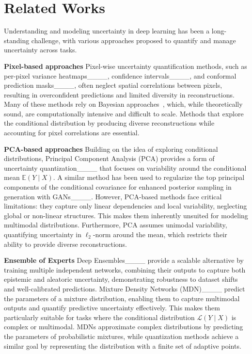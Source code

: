 \section{Related Works}
Understanding and modeling uncertainty in deep learning has been a long-standing challenge, with various approaches proposed to quantify and manage uncertainty across tasks.

\textbf{Pixel-based approaches}
Pixel-wise uncertainty quantification methods, such as per-pixel variance heatmaps____, confidence intervals____, and conformal prediction masks____, often neglect spatial correlations between pixels, resulting in overconfident predictions and limited diversity in reconstructions. Many of these methods rely on Bayesian approaches~\cite {gal2016dropout, blundell2015weight}, which, while theoretically sound, are computationally intensive and difficult to scale. Methods that explore the conditional distribution by producing diverse reconstructions while accounting for pixel correlations are essential.

\textbf{PCA-based approaches}
Building on the idea of exploring conditional distributions, Principal Component Analysis (PCA) provides a form of uncertainty quantization____ that focuses on variability around the conditional mean \( \mathbb{E}(Y \mid X) \). A similar method has been used to regularize the top principal components of the conditional covariance for enhanced posterior sampling in generation with GANs____.
However, PCA-based methods face critical limitations: they capture only linear dependencies and local variability, neglecting global or non-linear structures.
This makes them inherently unsuited for modeling multimodal distributions. Furthermore, PCA assumes unimodal variability, quantifying uncertainty in \( \ell_2 \)-norm around the mean, which restricts their ability to provide diverse reconstructions.
%

\textbf{Ensemble of Experts}
Deep Ensembles____ provide a scalable alternative by training multiple independent networks, combining their outputs to capture both epistemic and aleatoric uncertainty, demonstrating robustness to dataset shifts and well-calibrated predictions.
Mixture Density Networks (MDN)____ predict the parameters of a mixture distribution, enabling them to capture multimodal outputs and quantify predictive uncertainty effectively. This makes them particularly suitable for tasks where the conditional distribution \( \mathcal{L}(Y \mid X) \) is complex or multimodal.
MDNs approximate complex distributions by predicting the parameters of probabilistic mixtures, while quantization methods achieve a similar goal by representing the distribution with a finite set of adaptive points.


